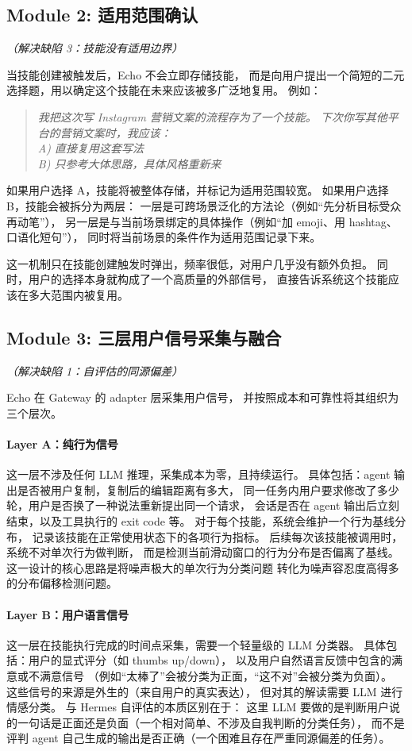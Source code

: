 \documentclass[12pt,a4paper]{article}
\begin{document}
	\subsection{Module 2: 适用范围确认}
	\textit{（解决缺陷 3：技能没有适用边界）}
	
	当技能创建被触发后，Echo 不会立即存储技能，
	而是向用户提出一个简短的二元选择题，用以确定这个技能在未来应该被多广泛地复用。
	例如：
	
	\begin{quote}
		\textit{我把这次写 Instagram 营销文案的流程存为了一个技能。
			下次你写其他平台的营销文案时，我应该：\\
			A) 直接复用这套写法 \\
			B) 只参考大体思路，具体风格重新来}
	\end{quote}
	
	如果用户选择 A，技能将被整体存储，并标记为适用范围较宽。
	如果用户选择 B，技能会被拆分为两层：
	一层是可跨场景泛化的方法论（例如``先分析目标受众再动笔''），
	另一层是与当前场景绑定的具体操作（例如``加 emoji、用 hashtag、口语化短句''），
	同时将当前场景的条件作为适用范围记录下来。
	
	这一机制只在技能创建触发时弹出，频率很低，对用户几乎没有额外负担。
	同时，用户的选择本身就构成了一个高质量的外部信号，
	直接告诉系统这个技能应该在多大范围内被复用。
	
	\subsection{Module 3: 三层用户信号采集与融合}
	\textit{（解决缺陷 1：自评估的同源偏差）}
	
	Echo 在 Gateway 的 adapter 层采集用户信号，
	并按照成本和可靠性将其组织为三个层次。
	
	\paragraph{Layer A：纯行为信号}
	这一层不涉及任何 LLM 推理，采集成本为零，且持续运行。
	具体包括：agent 输出是否被用户复制，复制后的编辑距离有多大，
	同一任务内用户要求修改了多少轮，用户是否换了一种说法重新提出同一个请求，
	会话是否在 agent 输出后立刻结束，以及工具执行的 exit code 等。
	对于每个技能，系统会维护一个行为基线分布，
	记录该技能在正常使用状态下的各项行为指标。
	后续每次该技能被调用时，系统不对单次行为做判断，
	而是检测当前滑动窗口的行为分布是否偏离了基线。
	这一设计的核心思路是将噪声极大的单次行为分类问题
	转化为噪声容忍度高得多的分布偏移检测问题。
	
	\paragraph{Layer B：用户语言信号}
	这一层在技能执行完成的时间点采集，需要一个轻量级的 LLM 分类器。
	具体包括：用户的显式评分（如 thumbs up/down），
	以及用户自然语言反馈中包含的满意或不满意信号
	（例如``太棒了''会被分类为正面，``这不对''会被分类为负面）。
	这些信号的来源是外生的（来自用户的真实表达），
	但对其的解读需要 LLM 进行情感分类。
	与 Hermes 自评估的本质区别在于：
	这里 LLM 要做的是判断用户说的一句话是正面还是负面（一个相对简单、不涉及自我判断的分类任务），
	而不是评判 agent 自己生成的输出是否正确（一个困难且存在严重同源偏差的任务）。
	
\end{document}
